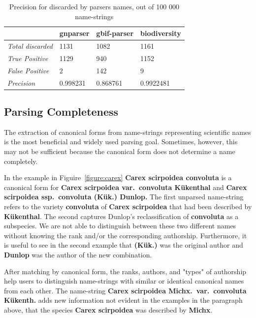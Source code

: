 \documentclass{bmcart}
\begin{document}
\begin{table}[htb]
  \begin{center}
    \caption{Precision for discarded by parsers names, out of 100 000
    name-strings}\label{table:unparsed}
    \resizebox{10cm}{!} {\begin{tabular}{| l | *{3}{l} |}
      \hline
                              & gnparser & gbif-parser & biodiversity \\
      \hline
      \textit{Total discarded}& 1131     & 1082        & 1161         \\
      \textit{True Positive}  & 1129     & 940         & 1152         \\
      \textit{False Positive} & 2        & 142         & 9            \\
      \textit{Precision}      & 0.998231 & 0.868761    & 0.9922481    \\
      \hline
    \end{tabular}
  }
  \end{center}
\end{table}

\subsection*{Parsing Completeness}

The extraction of canonical forms from name-strings representing scientific names is the most beneficial and widely used parsing goal. Sometimes, however, this may not be sufficient because the canonical form does not determine a name completely.

In the example in Figuire~\ref{figure:carex} \textbf{Carex scirpoidea convoluta} is a canonical form for \textbf{Carex scirpoidea var.\ convoluta Kükenthal} and \textbf{Carex scirpoidea ssp.\ convoluta (Kük.) Dunlop.} The first unparsed name-string refers to the variety \textbf{convoluta} of \textbf{Carex scirpoidea} that had been described by \textbf{Kükenthal}. The second captures Dunlop's reclassification of \textbf{convoluta} as a subspecies. We are not able to distinguish between these two different names without knowing the rank and/or the corresponding authorship. Furthermore, it is useful to see in the second example that \textbf{(Kük.)} was the original author and \textbf{Dunlop} was the author of the new combination.

After matching by canonical form, the ranks, authors, and "types" of authorship help users to distinguish name-strings with similar or identical canonical names from each other. The name-string \textbf{Carex scirpoidea Michx.\ var.\ convoluta Kükenth.} adds new information not evident in the examples in the paragraph above, that the species \textbf{Carex scirpoidea} was described by \textbf{Michx}.
\end{document}
